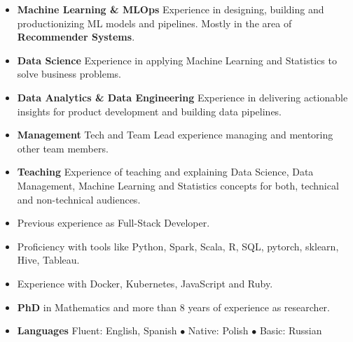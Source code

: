\documentclass[a4paper, oneside]{scrreprt}
\begin{document}
\begin{itemize}
\item \textbf{Machine Learning \& MLOps} Experience in designing, building and productionizing ML models and pipelines. 
Mostly in the area of \textbf{Recommender Systems}.
\item \textbf{Data Science} Experience in applying Machine Learning and Statistics to solve business problems.
\item \textbf{Data Analytics \& Data Engineering} Experience in delivering actionable insights for product development and building data pipelines.
\item \textbf{Management} Tech and Team Lead experience managing and mentoring other team members.
\item \textbf{Teaching} Experience of teaching and explaining Data Science, Data Management, Machine Learning and
  Statistics concepts for both, technical and non-technical audiences. %
\item Previous experience as Full-Stack Developer.
\item Proficiency with tools like Python, Spark, Scala, R, SQL, pytorch, sklearn, Hive, Tableau.
\item Experience with Docker, Kubernetes, JavaScript and Ruby. 
\item \textbf{PhD} in Mathematics and more than 8 years of experience as researcher. 
\item \textbf{Languages} Fluent: English, Spanish $\bullet$ Native: Polish  $\bullet$ Basic: Russian 
\end{itemize}
\end{document}
